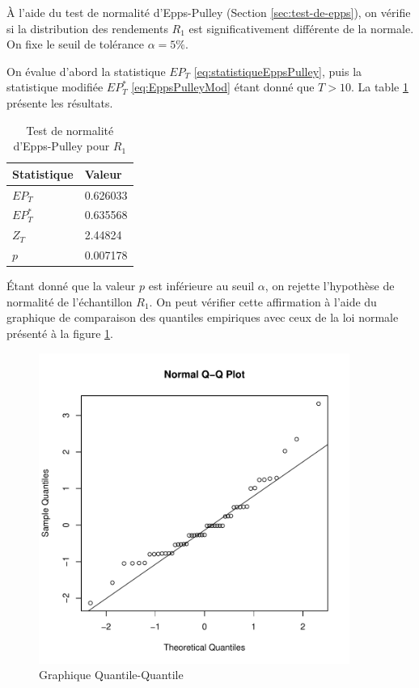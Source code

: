 À l'aide du test de normalité d'Epps-Pulley (Section
\ref{sec:test-de-epps}), on vérifie si la distribution des rendements
$R_1$ est significativement différente de la normale. On fixe le seuil
de tolérance $\alpha = 5\% $.

On évalue d'abord la statistique $EP_T$
\eqref{eq:statistiqueEppsPulley}, puis la statistique modifiée
$EP_T^{*}$ \eqref{eq:EppsPulleyMod} étant donné que $T>10$. La table
\ref{tab:eppspulleyR1} présente les résultats.

\begin{table}[!ht]
  \centering
  \begin{tabular}{ll}
    \hline
    \textbf{Statistique} & \textbf{Valeur} \\
    \hline
    $EP_T$ & 0.626033 \\
    $EP_T^{*}$ & 0.635568 \\
    $Z_T$ & 2.44824 \\
    $p$ & 0.007178 \\
    \hline
  \end{tabular}
  \caption{Test de normalité d'Epps-Pulley pour $R_1$}
  \label{tab:eppspulleyR1}
\end{table}

Étant donné que la valeur $p$ est inférieure au seuil $\alpha$, on
rejette l'hypothèse de normalité de l'échantillon $R_1$. On peut
vérifier cette affirmation à l'aide du graphique de comparaison des
quantiles empiriques avec ceux de la loi normale présenté à la figure
\ref{fig:qqplotR1}.

\begin{figure}[!ht]
  \centering
  \includegraphics[height=4in,
  width=4in]{../graphiques/ABBEYN-qq.pdf}
  \caption{Graphique Quantile-Quantile}
  \label{fig:qqplotR1}
\end{figure}

